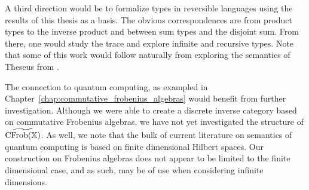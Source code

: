 A third direction would be to formalize types in reversible languages using the results of this
thesis as a basis. The obvious correspondences are from product types to the inverse product and
between sum types and the disjoint sum. From there, one would study the trace and explore infinite
and recursive types. Note that some of this work would follow naturally from exploring the semantics
of Theseus from \cite{james2013isomorphic,james2012information}.

The connection to quantum computing, as exampled in
Chapter~\ref{chap:commutative_frobenius_algebras} would benefit from further investigation. Although
we were able to create a discrete inverse category based on commutative Frobenius algebras, we have
not yet investigated the structure of $\widetilde{\text{CFrob}(\mathbb{X})}$. As well, we note that the
bulk of current literature on semantics of quantum computing is based on finite dimensional Hilbert
spaces. Our construction on Frobenius algebras does not appear to be limited to the finite
dimensional case, and as such, may be of use when considering  infinite dimensions.


